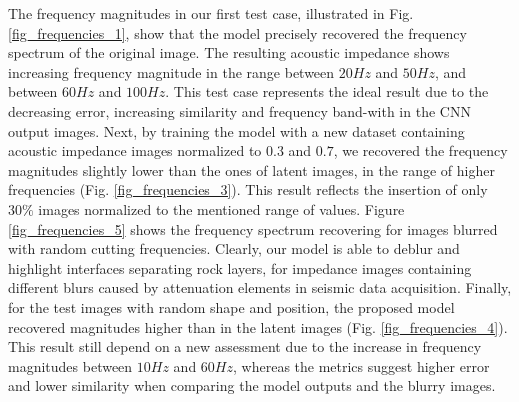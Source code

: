 \documentclass[conference]{IEEEtran}
\begin{document}
The frequency magnitudes in our first test case, illustrated in Fig. \ref{fig_frequencies_1},
show that the model precisely recovered the frequency spectrum of the original image.
The resulting acoustic impedance shows increasing frequency magnitude in the range
between $ 20Hz$ and $ 50Hz $, and between $ 60Hz $ and $ 100Hz $.
This test case represents the ideal result due to the
decreasing error, increasing similarity and frequency band-with in the CNN output images.
Next, by training the model with a new dataset containing acoustic impedance images normalized to $0.3$ and $0.7$, we recovered the frequency magnitudes slightly lower than the ones of latent images, in the range of higher frequencies
(Fig. \ref{fig_frequencies_3}). This result reflects the insertion of only $30\%$ images normalized to the mentioned range
of values.
Figure \ref{fig_frequencies_5} shows the frequency spectrum recovering for images blurred with random cutting
frequencies. Clearly, our model is able to deblur and highlight interfaces separating rock layers, for impedance images containing different blurs caused by attenuation elements in seismic data acquisition.
Finally, for the test images with random shape and position, the proposed model recovered magnitudes higher than in the latent images (Fig. \ref{fig_frequencies_4}). This result still depend on a new assessment due to the increase in frequency magnitudes between $10Hz$ and $60Hz$,  whereas the metrics suggest higher error and lower similarity when comparing the model outputs and the blurry images.
\end{document}
